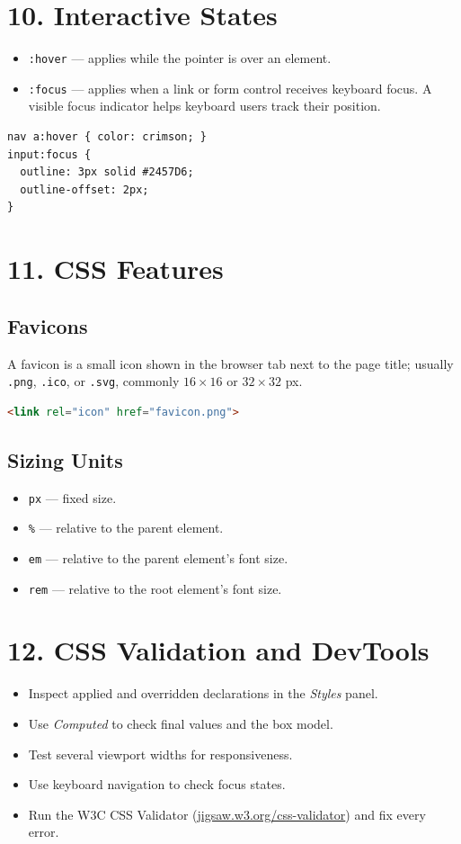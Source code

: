 \documentclass[12pt]{article}
\begin{document}
\section{10. Interactive States}
\begin{itemize}
    \item \texttt{:hover} — applies while the pointer is over an element.
    \item \texttt{:focus} — applies when a link or form control receives keyboard focus. A visible focus indicator helps keyboard users track their position.
\end{itemize}
\begin{lstlisting}
nav a:hover { color: crimson; }
input:focus {
  outline: 3px solid #2457D6;
  outline-offset: 2px;
}
\end{lstlisting}

\section{11. CSS Features}
\subsection{Favicons}
A favicon is a small icon shown in the browser tab next to the page title; usually \texttt{.png}, \texttt{.ico}, or \texttt{.svg}, commonly $16\times16$ or $32\times32$ px.
\begin{lstlisting}[language=HTML]
<link rel="icon" href="favicon.png">
\end{lstlisting}

\subsection{Sizing Units}
\begin{itemize}
    \item \texttt{px} — fixed size.
    \item \texttt{\%} — relative to the parent element.
    \item \texttt{em} — relative to the parent element's font size.
    \item \texttt{rem} — relative to the root element's font size.
\end{itemize}

\section{12. CSS Validation and DevTools}
\begin{itemize}
    \item Inspect applied and overridden declarations in the \emph{Styles} panel.
    \item Use \emph{Computed} to check final values and the box model.
    \item Test several viewport widths for responsiveness.
    \item Use keyboard navigation to check focus states.
    \item Run the W3C CSS Validator (\href{https://jigsaw.w3.org/css-validator/}{jigsaw.w3.org/css-validator}) and fix every error.
\end{itemize}
\end{document}
